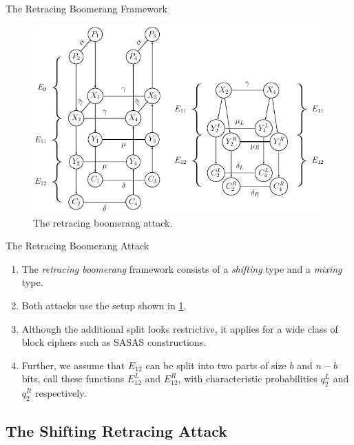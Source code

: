 \documentclass[notheorems]{beamer}
\theoremstyle{definition}
\theoremstyle{example}
\begin{document}
    \begin{frame}{The Retracing Boomerang Framework}
        \begin{figure}[!ht]
            \centering
            \includegraphics[width=0.6\columnwidth]{images/retracing_boomerang.png}
            \caption{The retracing boomerang attack.}
            \label{fig:retr-boomerang}
        \end{figure}
    \end{frame}

    \begin{frame}[<+->]{The Retracing Boomerang Attack}
        \begin{enumerate}
            \item The \emph{retracing boomerang} framework consists of a
            \emph{shifting} type and a \emph{mixing} type.
            \item Both attacks use the setup shown in \cref{fig:retr-boomerang}.
            \item Although the additional split looks restrictive, it applies
            for a wide class of block ciphers such as SASAS constructions.
            \item Further, we assume that \(E_{12}\) can be split into two parts
            of size \(b\) and \(n - b\) bits, call these functions \(E_{12}^L\)
            and \(E_{12}^R\), with characteristic probabilities \(q_2^L\) and
            \(q_2^R\) respectively.
        \end{enumerate}
    \end{frame}

    \subsection{The Shifting Retracing Attack}
    \label{subsec:shift-retr-boomerang}
\end{document}
